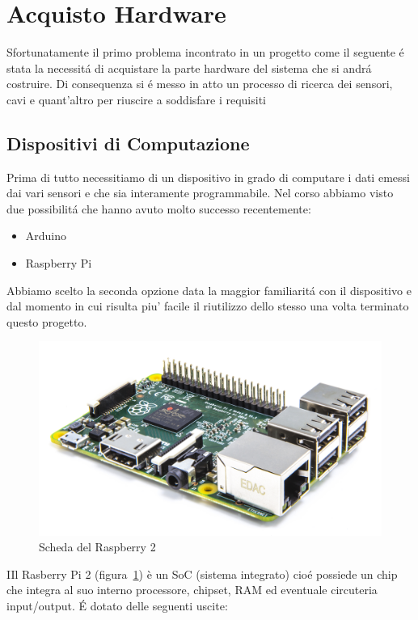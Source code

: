 \section{Acquisto Hardware}

Sfortunatamente il primo problema incontrato in un progetto come il seguente \'e stata la necessit\'a di acquistare la parte hardware del sistema che si andr\' a costruire. Di consequenza si \'e messo in atto un processo di ricerca dei sensori, cavi e quant'altro per riuscire a soddisfare i requisiti

\subsection{Dispositivi di Computazione}

Prima di tutto necessitiamo di un dispositivo in grado di computare i dati emessi dai vari sensori e che sia interamente programmabile. Nel corso abbiamo visto due possibilit\'a che hanno avuto molto successo recentemente:

\begin{itemize}
  \item Arduino
  \item Raspberry Pi
\end{itemize}

Abbiamo scelto la seconda opzione data la maggior familiarit\'a con il dispositivo e dal momento in cui risulta piu' facile il riutilizzo dello stesso una volta terminato questo progetto.

\begin{figure}
	\centering
	\includegraphics[width=0.7\linewidth]{Figures/Sensors&Rasp/Pi2}
	\caption[raspberry]{Scheda del Raspberry 2}
	\label{fig:Pi2}
\end{figure}

IIl Rasberry Pi 2 (figura~\ref{fig:Pi2}) è un SoC (sistema integrato) cio\'e possiede un chip che integra al suo interno processore, chipset, RAM ed eventuale circuteria input/output. \'E dotato delle seguenti uscite:

